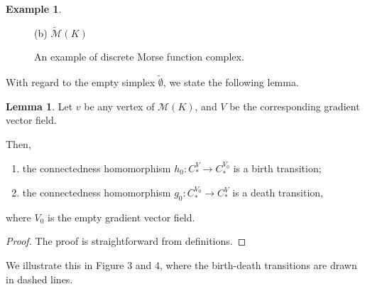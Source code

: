 \documentclass[a4paper,12pt,notitlepage]{amsart}
\theoremstyle{definition}%
\newtheorem{lemma}[theorem]{Lemma}
\newtheorem{example}[theorem]{Example}
\theoremstyle{definition}%
\theoremstyle{definition}%
\newcommand{\M}{\mathcal{M}}
\newcommand{\es}{\tilde{\emptyset}}
\newcommand{\MMK}{\widetilde{\mathcal{M}} (K)}
\begin{document}
\begin{example}
\begin{figure}[h!]
\begin{minipage}{.5\textwidth}

(b)  $\MMK$
\end{minipage}


\caption{An example of discrete Morse function complex.}

\end{figure} 

\end{example}





With regard to the empty simplex $\es$,
we state the following  lemma.

\begin{lemma}
\label{0-dim}
Let $v$ be any vertex of $\M(K)$,
and $V$ be the  corresponding   gradient vector field.

Then, 
\begin{enumerate}
\item the connectedness homomorphism $h_0: C_{\ast} ^{V} \to C_{\ast} ^{V_0}$
is a birth transition;
\item  the connectedness homomorphism $g_0: C_{\ast} ^{V_0} \to C_{\ast} ^{V}$
is a death transition,
\end{enumerate}
where $V_0$ 
is the empty gradient vector field.


\end{lemma}

\begin{proof}
The proof is straightforward from definitions.
\end{proof}



We illustrate this in Figure 3 and 4,
where the birth-death transitions
are drawn in dashed lines.
\end{document}
